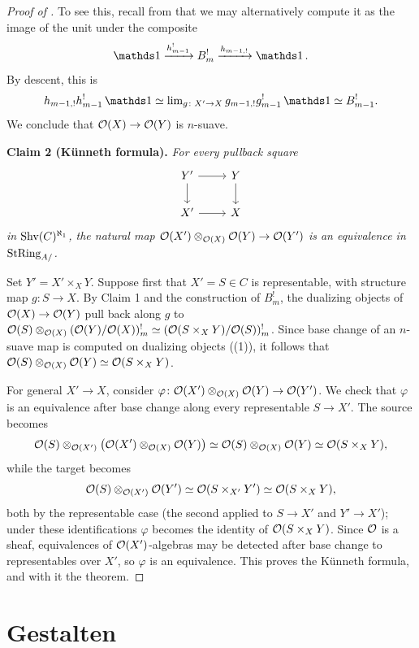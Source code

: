 \documentclass[11pt]{book}
\begin{document}
\begin{proof}[Proof of ]
		To see this, recall from  that we may alternatively compute it as the image of the unit under the composite
		\[
			\unit \xrightarrow{h^!_{m-1}} B^!_m \xrightarrow{h_{m-1,!}} \unit.
		\]
		By descent, this is
		\[
			h_{m-1,!}h^!_{m-1}\unit \simeq \lim_{g\colon X' \to X} g_{m-1,!}g_{m-1}^!\unit \simeq B^!_{m-1}.
		\]
		We conclude that $\mathcal{O}(X) \to \mathcal{O}(Y)$ is $n$-suave.

		\textbf{Claim 2 (Künneth formula).} \emph{For every pullback square}
		\[
			\begin{tikzcd}
				Y' \rar \dar & Y \dar \\
				X' \rar & X
			\end{tikzcd}
		\]
		\emph{in $\operatorname{Shv}(C)^{\aleph_1}$, the natural map $\mathcal{O}(X') \otimes_{\mathcal{O}(X)} \mathcal{O}(Y) \to \mathcal{O}(Y')$ is an equivalence in ${\textup{StRing}}_{A/}$.}

		Set $Y' = X' \times_X Y$. Suppose first that $X' = S \in C$ is representable, with structure map $g\colon S \to X$. By Claim 1 and the construction of $B^!_m$, the dualizing objects of $\mathcal{O}(X) \to \mathcal{O}(Y)$ pull back along $g$ to $\mathcal{O}(S) \otimes_{\mathcal{O}(X)} (\mathcal{O}(Y)/\mathcal{O}(X))^!_m \simeq (\mathcal{O}(S \times_X Y)/\mathcal{O}(S))^!_m$. Since base change of an $n$-suave map is computed on dualizing objects ((1)), it follows that $\mathcal{O}(S) \otimes_{\mathcal{O}(X)} \mathcal{O}(Y) \simeq \mathcal{O}(S \times_X Y)$.

		For general $X' \to X$, consider $\varphi\colon \mathcal{O}(X') \otimes_{\mathcal{O}(X)} \mathcal{O}(Y) \to \mathcal{O}(Y')$. We check that $\varphi$ is an equivalence after base change along every representable $S \to X'$. The source becomes
		\[
			\mathcal{O}(S) \otimes_{\mathcal{O}(X')}\bigl(\mathcal{O}(X') \otimes_{\mathcal{O}(X)} \mathcal{O}(Y)\bigr)
			\simeq \mathcal{O}(S) \otimes_{\mathcal{O}(X)} \mathcal{O}(Y)
			\simeq \mathcal{O}(S \times_X Y),
		\]
		while the target becomes
		\[
			\mathcal{O}(S) \otimes_{\mathcal{O}(X')} \mathcal{O}(Y')
			\simeq \mathcal{O}(S \times_{X'} Y')
			\simeq \mathcal{O}(S \times_X Y),
		\]
		both by the representable case (the second applied to $S \to X'$ and $Y' \to X'$); under these identifications $\varphi$ becomes the identity of $\mathcal{O}(S \times_X Y)$. Since $\mathcal{O}$ is a sheaf, equivalences of $\mathcal{O}(X')$-algebras may be detected after base change to representables over $X'$, so $\varphi$ is an equivalence. This proves the Künneth formula, and with it the theorem.
	\end{proof}

	\section{Gestalten}
\end{document}
